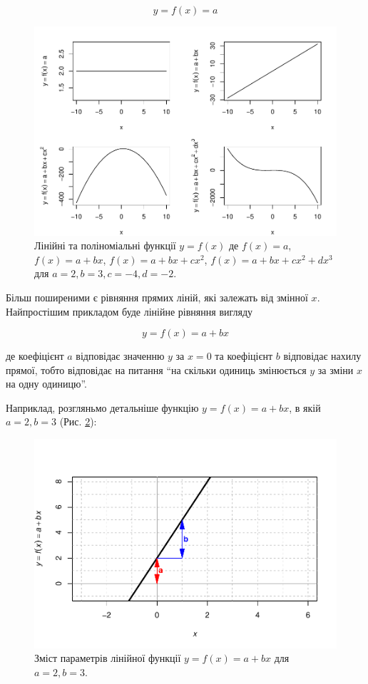\documentclass[
  11pt,
]{book}
\begin{document}
\[y = f(x) = a\]

\begin{figure}
\centering
\includegraphics{bookdown-demo_files/figure-latex/fig-3-1-1.pdf}
\caption{\label{fig:fig-3-1}Лінійні та поліноміальні функції \(y = f(x)\) де \(f(x) = a\), \(f(x) = a + bx\), \(f(x) = a + bx + cx^2\), \(f(x) = a + bx + cx^2 + dx^3\) для \(a=2, b = 3, c = -4, d = -2\).}
\end{figure}

Більш поширеними є рівняння прямих ліній, які залежать від змінної \(x\). Найпростішим прикладом буде лінійне рівняння вигляду

\[y = f(x) = a + bx\]

де коефіцієнт \(a\) відповідає значенню \(y\) за \(x = 0\) та коефіцієнт \(b\) відповідає нахилу прямої, тобто відповідає на питання ``на скільки одиниць змінюється \(y\) за зміни \(x\) на одну одиницю''.

Наприклад, розгляньмо детальніше функцію \(y = f(x) = a + bx\), в якій \(a = 2, b = 3\) (Рис. \ref{fig:fig-3-2}):

\begin{figure}
\centering
\includegraphics{bookdown-demo_files/figure-latex/fig-3-2-1.pdf}
\caption{\label{fig:fig-3-2}Зміст параметрів лінійної функції \(y = f(x) = a + bx\) для \(a=2, b = 3\).}
\end{figure}
\end{document}
